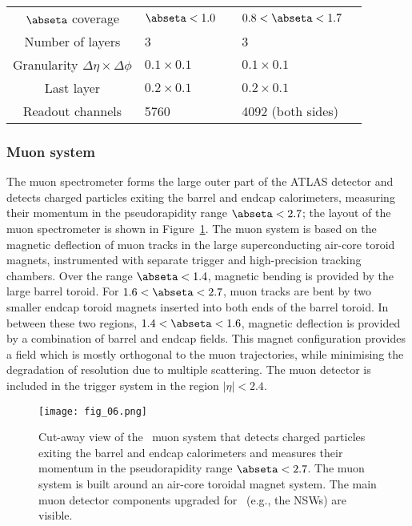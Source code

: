 \documentclass[cernpreprint, atlasdraft=false, UKenglish,british,orcidlogo, texmf, orcidlogo]{atlasdoc}
\begin{document}
\begin{table}
\begin{center}
\begin{tabular}{|c|l r|l l|}
$\abseta$ coverage & $\abseta<1.0$ & & $0.8<\abseta<1.7$ & \\
Number of layers & 3 & & 3 & \\
\hline
Granularity ${\Delta\eta\times\Delta\phi}$ & $0.1\times 0.1$ & & $0.1\times 0.1$ & \\
Last layer                       & $0.2\times 0.1$ & & $0.2\times 0.1$ & \\
\hline
Readout channels &  \num{5760} & &  \num{4092} (both sides) &  \\
\hline
\end{tabular}
\end{center}
\end{table}
 
 
 
\subsubsection{Muon system}
 
The muon spectrometer forms the large outer part of the ATLAS detector and
detects charged particles exiting the barrel and endcap
calorimeters, measuring their momentum in the pseudorapidity range
$\abseta<2.7$; the layout of the muon spectrometer is shown
in Figure~\ref{fig:Overview:muons}. The muon system is based on the
magnetic deflection of muon tracks in the large superconducting
air-core toroid magnets, instrumented with separate trigger and
high-precision tracking chambers. Over the range $\abseta<1.4$,
magnetic bending is provided by the large barrel toroid. For
$1.6<\abseta<2.7$, muon tracks are bent by two smaller endcap toroid magnets
inserted into both ends of the barrel toroid. In between these two regions, $1.4<\abseta<1.6$, magnetic deflection is provided by a combination of barrel and endcap fields. This magnet configuration provides a field which is mostly
orthogonal to the muon trajectories, while minimising the
degradation of resolution due to multiple scattering. The muon detector is included in the trigger system in the region $|\eta| < 2.4$.
 
\begin{figure}[t]
\centerline{\texttt{[image: fig\_06.png]}}
\caption{Cut-away view of the \ATLAS\ muon system that detects charged particles exiting the barrel and endcap
calorimeters and measures their momentum in the pseudorapidity range
$\abseta<2.7$. The muon system is built around an air-core toroidal magnet system. The main muon detector components upgraded for \RunThr\ (e.g., the \glspl{NSW}) are visible. \label{fig:Overview:muons}  }
\end{figure}
 
\end{document}
